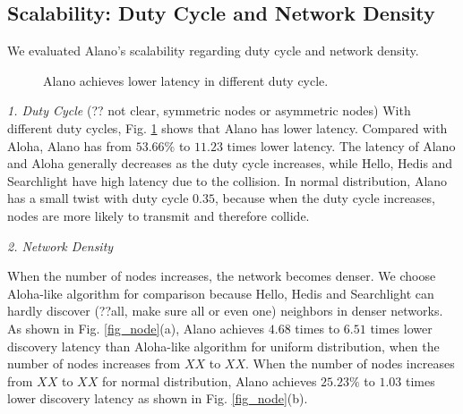 \subsection{Scalability: Duty Cycle and Network Density}

We evaluated Alano's scalability regarding duty cycle and network density.

\begin{figure}[!h]
\centering
{}
\hspace{0.01in}
\caption{Alano achieves lower latency in different duty cycle.}
\label{fig_dutycycle}
\end{figure}


\emph{1. Duty Cycle}
(?? not clear, symmetric nodes or asymmetric nodes)
With different duty cycles, Fig. \ref{fig_dutycycle} shows that Alano has lower latency. Compared with Aloha, Alano has from $53.66\%$ to $11.23$ times lower latency. The latency of Alano and Aloha generally decreases as the duty cycle increases, while Hello, Hedis and Searchlight have high latency due to the collision. In normal distribution, Alano has a small twist with duty cycle $0.35$, because when the duty cycle increases, nodes are more likely to transmit and therefore collide.


\emph{2. Network Density}

When the number of nodes increases, the network becomes denser. We choose Aloha-like algorithm for comparison because Hello, Hedis and Searchlight can hardly discover (??all, make sure all or even one) neighbors in denser networks.
As shown in Fig. \ref{fig_node}(a), Alano achieves $4.68$ times to $6.51$ times lower discovery latency than Aloha-like algorithm for uniform distribution, when the number of nodes increases from $XX$ to $XX$.
When the number of nodes increases from $XX$ to $XX$ for normal distribution, Alano achieves $25.23\%$ to $1.03$ times lower discovery latency as shown in Fig. \ref{fig_node}(b).  

